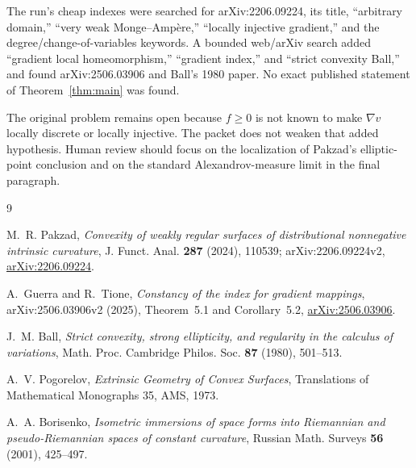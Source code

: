 \documentclass[11pt]{article}
\begin{document}
The run's cheap indexes were searched for arXiv:2206.09224, its title,
``arbitrary domain,'' ``very weak Monge--Amp\`ere,'' ``locally injective
gradient,'' and the degree/change-of-variables keywords.  A bounded
web/arXiv search added ``gradient local homeomorphism,'' ``gradient index,''
and ``strict convexity Ball,'' and found arXiv:2506.03906 and Ball's 1980
paper.  No exact published statement of Theorem~\ref{thm:main} was found.

The original problem remains open because $f\geq0$ is not known to make
$\nabla v$ locally discrete or locally injective.  The packet does not weaken
that added hypothesis.  Human review should focus on the localization of
Pakzad's elliptic-point conclusion and on the standard Alexandrov-measure
limit in the final paragraph.

\begin{thebibliography}{9}

M.~R. Pakzad,
\emph{Convexity of weakly regular surfaces of distributional nonnegative
intrinsic curvature},
J. Funct. Anal. \textbf{287} (2024), 110539;
arXiv:2206.09224v2,
\href{https://arxiv.org/abs/2206.09224}{arXiv:2206.09224}.

A.~Guerra and R.~Tione,
\emph{Constancy of the index for gradient mappings},
arXiv:2506.03906v2 (2025), Theorem~5.1 and Corollary~5.2,
\href{https://arxiv.org/abs/2506.03906}{arXiv:2506.03906}.

J.~M. Ball,
\emph{Strict convexity, strong ellipticity, and regularity in the calculus
of variations},
Math. Proc. Cambridge Philos. Soc. \textbf{87} (1980), 501--513.

A.~V. Pogorelov,
\emph{Extrinsic Geometry of Convex Surfaces},
Translations of Mathematical Monographs 35, AMS, 1973.

A.~A. Borisenko,
\emph{Isometric immersions of space forms into Riemannian and pseudo-Riemannian
spaces of constant curvature},
Russian Math. Surveys \textbf{56} (2001), 425--497.

\end{thebibliography}
\end{document}

